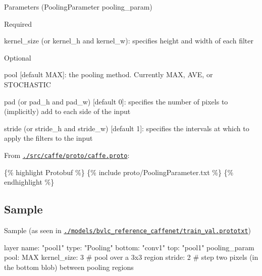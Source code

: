 \begin{DoxyItemize}
\item Parameters ({\ttfamily Pooling\+Parameter pooling\+\_\+param})
\begin{DoxyItemize}
\item Required
\begin{DoxyItemize}
\item {\ttfamily kernel\+\_\+size} (or {\ttfamily kernel\+\_\+h} and {\ttfamily kernel\+\_\+w})\+: specifies height and width of each filter
\end{DoxyItemize}
\item Optional
\begin{DoxyItemize}
\item {\ttfamily pool} \mbox{[}default M\+AX\mbox{]}\+: the pooling method. Currently M\+AX, A\+VE, or S\+T\+O\+C\+H\+A\+S\+T\+IC
\item {\ttfamily pad} (or {\ttfamily pad\+\_\+h} and {\ttfamily pad\+\_\+w}) \mbox{[}default 0\mbox{]}\+: specifies the number of pixels to (implicitly) add to each side of the input
\item {\ttfamily stride} (or {\ttfamily stride\+\_\+h} and {\ttfamily stride\+\_\+w}) \mbox{[}default 1\mbox{]}\+: specifies the intervals at which to apply the filters to the input
\end{DoxyItemize}
\end{DoxyItemize}
\item From \href{https://github.com/BVLC/caffe/blob/master/src/caffe/proto/caffe.proto}{\tt {\ttfamily ./src/caffe/proto/caffe.proto}}\+:
\end{DoxyItemize}

\{\% highlight Protobuf \%\} \{\% include proto/\+Pooling\+Parameter.\+txt \%\} \{\% endhighlight \%\}

\subsection*{Sample}


\begin{DoxyItemize}
\item Sample (as seen in \href{https://github.com/BVLC/caffe/blob/master/models/bvlc_reference_caffenet/train_val.prototxt}{\tt {\ttfamily ./models/bvlc\+\_\+reference\+\_\+caffenet/train\+\_\+val.prototxt}}) \begin{DoxyVerb}layer {
  name: "pool1"
  type: "Pooling"
  bottom: "conv1"
  top: "pool1"
  pooling_param {
    pool: MAX
    kernel_size: 3 # pool over a 3x3 region
    stride: 2      # step two pixels (in the bottom blob) between pooling regions
  }
}\end{DoxyVerb}
 
\end{DoxyItemize}